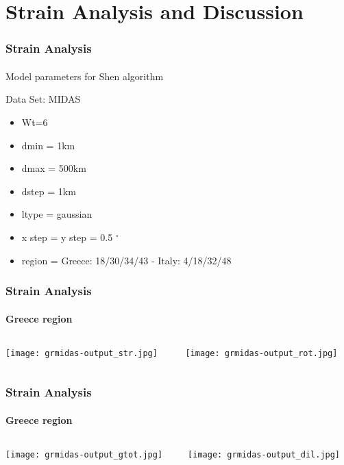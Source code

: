 \section{Strain Analysis and Discussion}
 
\graphicspath{{Chapter4/Figs/}}

\begin{frame}
 \frametitle{Strain Analysis}
 \framesubtitle{}
 \label{ch4:}
 
  Model parameters for Shen algorithm
  
  Data Set: MIDAS
  \begin{itemize}
    \item Wt=6
    \item dmin = 1km
    \item dmax = 500km
    \item dstep = 1km
    \item ltype = gaussian
    \item x step = y step = 0.5 $^{\circ}$
    \item region = Greece: 18/30/34/43 -  Italy: 4/18/32/48
  \end{itemize}

\end{frame}
\note{}

\begin{frame}
 \frametitle{Strain Analysis}
 \framesubtitle{Greece region}
 \label{ch4:}
   
  \begin{columns}
    \begin{column}{0.5\textwidth}
      
      \texttt{[image: grmidas-output\_str.jpg]}   
    \end{column}
    \begin{column}{0.5\textwidth}
    \begin{center}
      
      \texttt{[image: grmidas-output\_rot.jpg]}     
    \end{center}
    \end{column}
  \end{columns}

\end{frame}
\note{}

\begin{frame}
 \frametitle{Strain Analysis}
 \framesubtitle{Greece region}
 \label{ch4:}
   
  \begin{columns}
    \begin{column}{0.5\textwidth}
      \texttt{[image: grmidas-output\_gtot.jpg]}   
    \end{column}
    \begin{column}{0.5\textwidth}
    \begin{center}
      \texttt{[image: grmidas-output\_dil.jpg]}     
    \end{center}
    \end{column}
  
  \end{columns}

\end{frame}
\note{}



